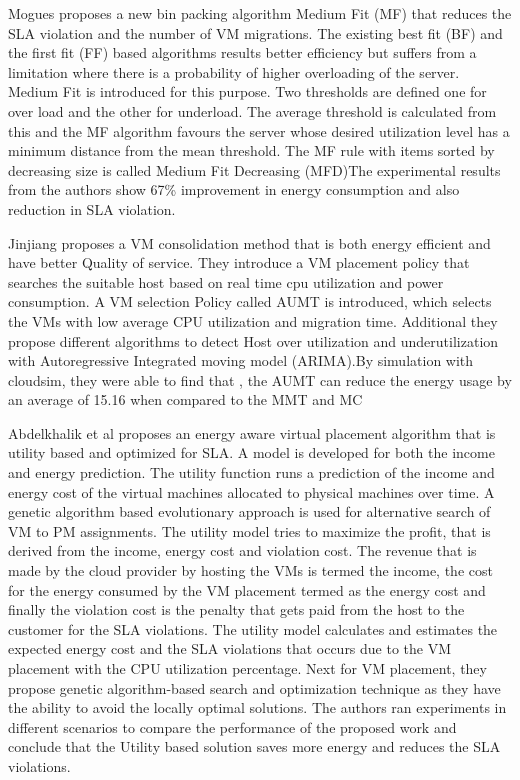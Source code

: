 \documentclass[a4paper,12pt]{Classes/RoboticsLaTeX}
\begin{document}
    Mogues \cite{moges2019energy} proposes a new bin packing algorithm Medium Fit (MF) that reduces the SLA violation and the number of VM migrations. The existing best fit (BF) and the first fit (FF) based algorithms results better efficiency but suffers from a limitation where there is a probability of higher overloading of the server. Medium Fit is introduced for this purpose. Two thresholds are defined one for over load and the other for underload. The average threshold is calculated from this and the MF algorithm favours the server whose desired utilization level has a minimum distance from the mean threshold. The MF rule with items sorted by decreasing size is called Medium Fit Decreasing (MFD)The experimental results from the authors show 67\% improvement in energy consumption and also reduction in SLA violation.
    
    Jinjiang \cite{wang2022research} proposes a VM consolidation method that is both energy efficient and have better Quality of service. They introduce a VM placement policy that searches the suitable host based on real time  cpu  utilization and power consumption. A VM selection Policy called AUMT is introduced, which selects the VMs with low average CPU utilization and migration time. Additional they propose different algorithms to detect Host over utilization and underutilization with Autoregressive Integrated moving model (ARIMA).By simulation with cloudsim, they were able to find that , the AUMT can reduce the energy usage by an average of 15.16 when compared to the MMT and MC
    
    Abdelkhalik et al \cite{mosa2019dynamic}proposes an energy aware virtual placement algorithm that is utility based and optimized for SLA. A model is developed for both the income and energy prediction.  The utility function runs a prediction of the income and energy cost of the virtual machines allocated to physical machines over time. A genetic algorithm based evolutionary approach is used for alternative search of VM to PM assignments. 
    The utility model tries to maximize the profit, that is derived from the income, energy cost and violation cost. The revenue that is made by the cloud provider by hosting the VMs is termed the income, the cost for the energy consumed by the VM placement termed as the energy cost and finally the violation cost is the penalty that gets paid from the host to the customer for the SLA violations. The utility model calculates and estimates the expected energy cost and the SLA violations that occurs due to the VM placement with the CPU utilization percentage. Next for VM placement, they propose genetic algorithm-based search and optimization technique as they have the ability to avoid the locally optimal solutions.
    The authors ran experiments in different scenarios to compare the performance of the proposed work and conclude that the Utility based solution saves more energy and reduces the SLA violations.
\end{document}
